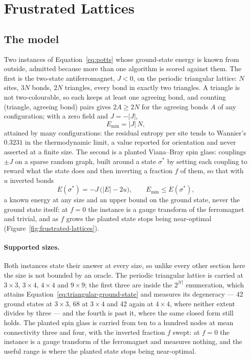 \documentclass[11pt,a4paper]{article}
\begin{document}
\section{Frustrated Lattices}
\label{sec:frustrated}

\subsection{The model}
\label{sec:frustrated:model}
Two instances of Equation~\ref{eq:potts} whose ground-state energy is known
from outside, admitted because more than one algorithm is scored against
them. The first is the two-state antiferromagnet, $J < 0$, on the periodic
triangular lattice: $N$ sites, $3N$ bonds, $2N$ triangles, every bond in
exactly two triangles. A triangle is not two-colourable, so each keeps at
least one agreeing bond, and counting (triangle, agreeing bond) pairs gives
$2 A \ge 2N$ for the agreeing bonds $A$ of any configuration; with a zero
field and $J = -|J|$,
\begin{equation}
  E_{\min} = |J|\, N ,
  \label{eq:triangular-ground-state}
\end{equation}
attained by many configurations: the residual entropy per site tends to
Wannier's $0.3231$ in the thermodynamic limit, a value reported for orientation
and never asserted at a finite size. The second is a planted
Viana--Bray spin glass: couplings $\pm J$ on a sparse random graph, built
around a state $\sigma^{\ast}$ by setting each coupling to reward what the
state does and then inverting a fraction $f$ of them, so that with $u$
inverted bonds
\begin{equation}
  E(\sigma^{\ast}) = -J\,\big(|E| - 2u\big),
  \qquad
  E_{\min} \le E(\sigma^{\ast}),
  \label{eq:planted-energy}
\end{equation}
a known energy at any size and an upper bound on the ground state, never the
ground state itself: at $f = 0$ the instance is a gauge transform of the
ferromagnet and trivial, and as $f$ grows the planted state stops being
near-optimal (Figure~\ref{fig:frustrated-lattices}).

\paragraph{Supported sizes.}
\label{par:frustrated:sizes}
Both instances state their answer at every size, so unlike every other
section here the size is not bounded by an oracle. The periodic triangular
lattice is carried at $3 \times 3$, $3 \times 4$, $4 \times 4$ and
$9 \times 9$; the first three are inside the $2^{|V|}$ enumeration, which
attains Equation~\ref{eq:triangular-ground-state} and measures its
degeneracy --- 42 ground states at $3 \times 3$, 68 at $3 \times 4$ and 42
again at $4 \times 4$, where neither extent divides by three --- and the
fourth is past it, where the same closed form still holds. The planted
spin glass is carried from ten to a hundred nodes at mean connectivity
three and four, with the inverted fraction $f$ swept: at $f = 0$ the instance
is a gauge transform of the ferromagnet and measures nothing, and the useful
range is where the planted state stops being near-optimal.
\end{document}
